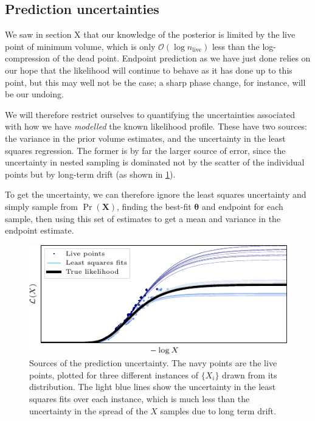\documentclass[usenatbib]{mnras}
\newcommand{\thetab}{\bm{\theta}}
\newcommand{\set}[1]{\{#1\}}
\newcommand{\nlive}{n_\mathrm{live}}
\begin{document}
\subsection{Prediction uncertainties}
We saw in section X that our knowledge of the posterior is limited by the live point of minimum volume, which is only $\mathcal{O}(\log \nlive)$ less than the log-compression of the dead point. Endpoint prediction as we have just done relies on our hope that the likelihood will continue to behave as it has done up to this point, but this may well not be the case; a sharp phase change, for instance, will be our undoing.
\par
We will therefore restrict ourselves to quantifying the uncertainties associated with how we have \textit{modelled} the known likelihood profile. These have two sources: the variance in the prior volume estimates, and the uncertainty in the least squares regression. The former is by far the larger source of error, since the uncertainty in nested sampling is dominated not by the scatter of the individual points but by long-term drift (as shown in \cref{fig:prediction_uncertainty}).
\par
To get the uncertainty, we can therefore ignore the least squares uncertainty and simply sample from $\Pr(\bm{X})$, finding the best-fit $\thetab$ and endpoint for each sample, then using this set of estimates to get a mean and variance in the endpoint estimate.
\begin{figure}
\begin{center}
	\includegraphics[max width=\linewidth]{figures/prediction_uncertainty.pdf}
\end{center}
\caption{Sources of the prediction uncertainty. The navy points are the live points, plotted for three different instances of $\set{X_i}$ drawn from its distribution. The light blue lines show the uncertainty in the least squares fits over each instance, which is much less than the uncertainty in the spread of the $X$ samples due to long term drift.}
\label{fig:prediction_uncertainty}
\end{figure}
\end{document}
